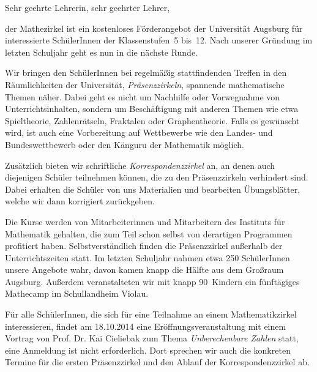 \documentclass{zirkelbrief}
\begin{document}
\renewcommand{\anschrift}{%
      Holbein-Gymnasium Augsburg \\
      Fachbereich Mathematik \\
      Hallstraße 10 \\
      86150 Augsburg}
\renewcommand{\datum}{\today}
\renewcommand{\betreff}{Matheschülerzirkel der Universität Augsburg}

\makeletterhead

Sehr geehrte Lehrerin, sehr geehrter Lehrer,

der Mathezirkel ist ein kostenloses Förderangebot der Universität Augsburg für interessierte SchülerInnen
der Klassenstufen~5 bis~12. Nach unserer Gründung im letzten Schuljahr geht es nun in die nächste Runde.

Wir bringen den SchülerInnen bei regelmäßig stattfindenden Treffen in
den Räumlichkeiten der Universität, \emph{Präsenzzirkeln}, spannende mathematische Themen
näher. Dabei geht es nicht um Nachhilfe oder Vorwegnahme von
Unterrichtsinhalten, sondern um Beschäftigung mit anderen Themen wie etwa
Spieltheorie, Zahlenrätseln, Fraktalen oder Graphentheorie. Falls es gewünscht
wird, ist auch eine Vorbereitung auf Wettbewerbe wie den Landes- und
Bundeswettbewerb oder den Känguru der Mathematik möglich.

Zusätzlich bieten wir schriftliche \emph{Korrespondenzzirkel} an, an denen auch diejenigen Schüler teilnehmen können, die zu den Präsenzzirkeln verhindert sind. Dabei erhalten die Schüler von uns
Materialien und bearbeiten Übungsblätter, welche wir dann korrigiert zurückgeben.

Die Kurse werden von Mitarbeiterinnen und Mitarbeitern des Instituts für
Mathematik gehalten, die zum Teil schon selbst von derartigen Programmen
profitiert haben. Selbstverständlich finden die Präsenzzirkel
außerhalb der Unterrichtszeiten statt.
Im letzten Schuljahr nahmen etwa 250 SchülerInnen unsere
Angebote wahr, davon kamen knapp die Hälfte aus dem Großraum Augsburg. Außerdem veranstalteten wir mit knapp 90~Kindern ein fünftägiges Mathecamp im Schullandheim Violau.

Für alle SchülerInnen, die sich für eine Teilnahme an einem Mathematikzirkel
interessieren, findet am 18.10.2014 eine Eröffnungsveranstaltung mit einem Vortrag von
Prof. Dr. Kai Cieliebak zum Thema \emph{Unberechenbare Zahlen}
statt, eine
Anmeldung ist nicht erforderlich. Dort sprechen wir auch die konkreten Termine für die
ersten Präsenzzirkel und den Ablauf der Korrespondenzzirkel ab.
\end{document}
